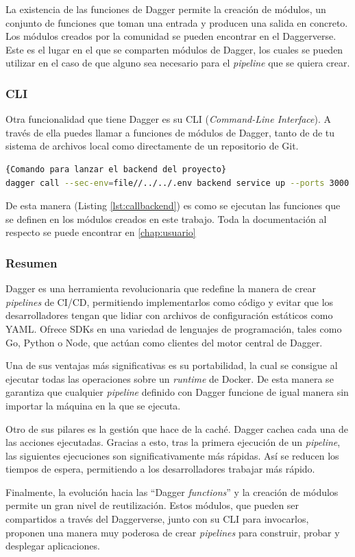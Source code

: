 La existencia de las funciones de Dagger permite la creación de módulos, un conjunto de funciones que toman una entrada y producen una salida en concreto. Los módulos creados por la comunidad se pueden encontrar en el Daggerverse\cite{daggerverse}. Este es el lugar en el que se comparten módulos de Dagger, los cuales se pueden utilizar en el caso de que alguno sea necesario para el \textit{pipeline} que se quiera crear.

\subsubsection*{CLI}

Otra funcionalidad que tiene Dagger es su CLI\cite{cli} (\textit{Command-Line Interface}). A través de ella puedes llamar a funciones de módulos de Dagger, tanto de de tu sistema de archivos local como directamente de un repositorio de Git.

\begin{lstlisting}[language=bash,label=lst:callbackend]{Comando para lanzar el backend del proyecto}
dagger call --sec-env=file//../../.env backend service up --ports 3000:3000
\end{lstlisting}

De esta manera (Listing \ref{lst:callbackend}) es como se ejecutan las funciones que se definen en los módulos creados en este trabajo. Toda la documentación al respecto se puede encontrar en \ref{chap:usuario}

\subsubsection*{Resumen}

Dagger es una herramienta revolucionaria que redefine la manera de crear \textit{pipelines} de CI/CD, permitiendo implementarlos como código y evitar que los desarrolladores tengan que lidiar con archivos de configuración estáticos como YAML. Ofrece SDKs en una variedad de lenguajes de programación, tales como Go, Python o Node, que actúan como clientes del motor central de Dagger.

Una de sus ventajas más significativas es su portabilidad, la cual se consigue al ejecutar todas las operaciones sobre un \textit{runtime} de Docker. De esta manera se garantiza que cualquier \textit{pipeline} definido con Dagger funcione de igual manera sin importar la máquina en la que se ejecuta.

Otro de sus pilares es la gestión que hace de la caché. Dagger cachea cada una de las acciones ejecutadas. Gracias a esto, tras la primera ejecución de un \textit{pipeline}, las siguientes ejecuciones son significativamente más rápidas. Así se reducen los tiempos de espera, permitiendo a los desarrolladores trabajar más rápido.

Finalmente, la evolución hacia las ``Dagger \textit{functions}'' y la creación de módulos permite un gran nivel de reutilización. Estos módulos, que pueden ser compartidos a través del Daggerverse, junto con su CLI para invocarlos, proponen una manera muy poderosa de crear \textit{pipelines} para construir, probar y desplegar aplicaciones.
